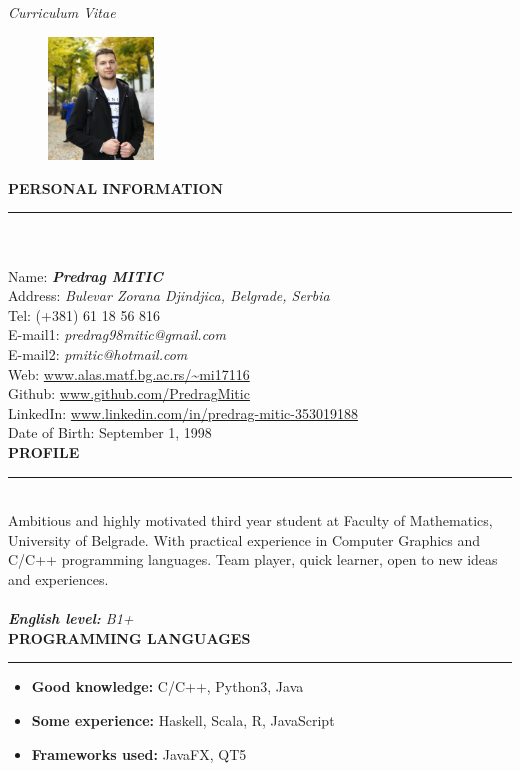 \documentclass{article}
\begin{document}
\begin{center}
	\textit{\Huge Curriculum Vitae}   
	\vspace*{1cm}
\end{center}

\begin{figure} 
	\includegraphics[width=0.25\textwidth]{my_pic.jpeg}
\end{figure}

\color{my_col}
\textbf{\large PERSONAL INFORMATION}\\
\noindent\rule{10cm}{1.5pt}\color{black}\\ \\
Name:  \textbf{\emph{Predrag MITIC}} \\
Address: \emph{Bulevar Zorana Djindjica, Belgrade, Serbia }\\
Tel: 	(+381) 61 18 56 816 \\
E-mail1:	\textit{predrag98mitic@gmail.com} \\ 
E-mail2:	\textit{pmitic@hotmail.com} \\ 
Web:	\url{www.alas.matf.bg.ac.rs/~mi17116} \\
Github:	\url{www.github.com/PredragMitic} \\ 
LinkedIn: \url{www.linkedin.com/in/predrag-mitic-353019188}\\
Date of Birth: September 1, 1998 \\ 

\color{my_col}
\textbf{\large PROFILE}\\
\noindent\rule{15.4cm}{1.6pt}\color{black}\\ 
Ambitious and highly motivated third year student at Faculty of Mathematics, 
University of Belgrade. With practical experience in Computer Graphics and 
C/C++ programming languages. Team player, quick learner, open to new ideas and experiences.\\ \\
\textit{\textbf{English level: } B1+}\\

\color{my_col}
\textbf{\large PROGRAMMING LANGUAGES}\\
\noindent\rule{15.4cm}{1.6pt}\color{black}
\normalsize
\begin{itemize}
	\item\textbf{Good knowledge: 	} C/C++, Python3, Java
	\item\textbf{Some experience:	} Haskell, Scala, R, JavaScript
	\item\textbf{Frameworks used:} JavaFX, QT5\\
\end{itemize}
  
\end{document}
